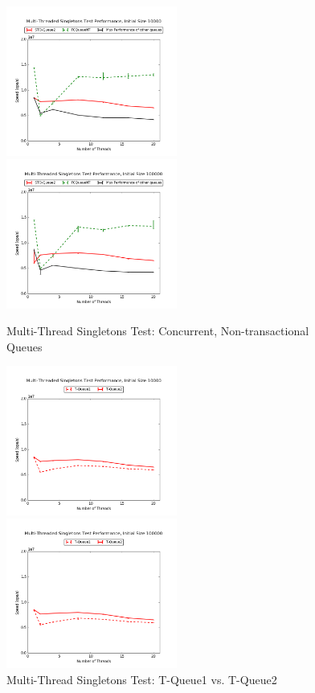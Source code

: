 \begin{figure}[H]
\centering
    \includegraphics[width=0.5\textwidth]{concurrent/Q:RandSingleOps10000.png}
    \includegraphics[width=0.5\textwidth]{concurrent/Q:RandSingleOps100000.png}
\caption{Multi-Thread Singletons Test: Concurrent, Non-transactional Queues}
\label{fig:concurrent_qs}
\end{figure}

\begin{figure}[H]
    \centering
    \includegraphics[width=0.5\textwidth]{fcqueues/stoQ:RandSingleOps10000.png}
    
    \includegraphics[width=0.5\textwidth]{fcqueues/stoQ:RandSingleOps100000.png}
    
\caption{Multi-Thread Singletons Test: T-Queue1 vs. T-Queue2}
\label{fig:stoqueues}
\end{figure}

